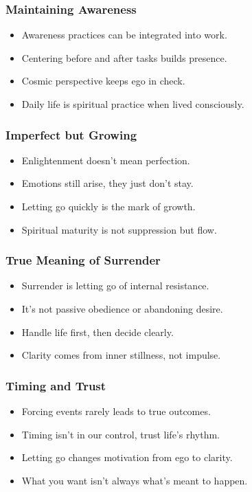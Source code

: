 \begin{frame}[fragile]\frametitle{Maintaining Awareness}
  \begin{itemize}
    \item Awareness practices can be integrated into work.
    \item Centering before and after tasks builds presence.
    \item Cosmic perspective keeps ego in check.
    \item Daily life is spiritual practice when lived consciously.
  \end{itemize}
\end{frame}

\begin{frame}[fragile]\frametitle{Imperfect but Growing}
  \begin{itemize}
    \item Enlightenment doesn’t mean perfection.
    \item Emotions still arise, they just don’t stay.
    \item Letting go quickly is the mark of growth.
    \item Spiritual maturity is not suppression but flow.
  \end{itemize}
\end{frame}

\begin{frame}[fragile]\frametitle{True Meaning of Surrender}
  \begin{itemize}
    \item Surrender is letting go of internal resistance.
    \item It's not passive obedience or abandoning desire.
    \item Handle life first, then decide clearly.
    \item Clarity comes from inner stillness, not impulse.
  \end{itemize}
\end{frame}

\begin{frame}[fragile]\frametitle{Timing and Trust}
  \begin{itemize}
    \item Forcing events rarely leads to true outcomes.
    \item Timing isn't in our control, trust life’s rhythm.
    \item Letting go changes motivation from ego to clarity.
    \item What you want isn’t always what’s meant to happen.
  \end{itemize}
\end{frame}

